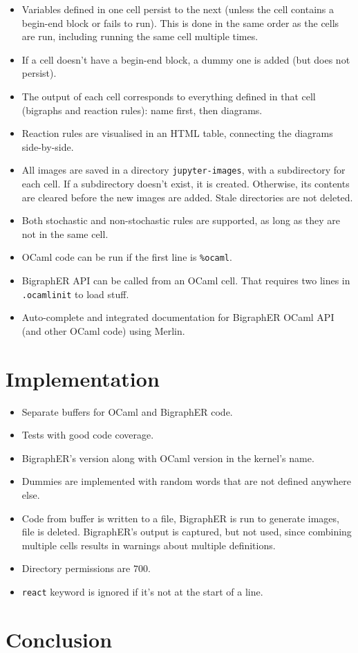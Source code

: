 \documentclass{article}
\begin{document}
\begin{itemize}
\item Variables defined in one cell persist to the next (unless the cell
  contains a begin-end block or fails to run). This is done in the same order as
  the cells are run, including running the same cell multiple times.
\item If a cell doesn't have a begin-end block, a dummy one is added (but does
  not persist).
\item The output of each cell corresponds to everything defined in that cell
  (bigraphs and reaction rules): name first, then diagrams.
\item Reaction rules are visualised in an HTML table, connecting the diagrams
  side-by-side.
\item All images are saved in a directory \texttt{jupyter-images}, with a
  subdirectory for each cell. If a subdirectory doesn't exist, it is created.
  Otherwise, its contents are cleared before the new images are added. Stale
  directories are not deleted.
\item Both stochastic and non-stochastic rules are supported, as long as they
  are not in the same cell.
\item OCaml code can be run if the first line is \texttt{\%ocaml}.

\item BigraphER API can be called from an OCaml cell. That requires two lines in
  \texttt{.ocamlinit} to load stuff.
\item Auto-complete and integrated documentation for BigraphER OCaml API (and
  other OCaml code) using Merlin.
\end{itemize}

\section{Implementation}


\begin{itemize}
\item Separate buffers for OCaml and BigraphER code.
\item Tests with good code coverage.
\item BigraphER's version along with OCaml version in the kernel's name.
\item Dummies are implemented with random words that are not defined anywhere else.
\item Code from buffer is written to a file, BigraphER is run to generate
  images, file is deleted. BigraphER's output is captured, but not used, since
  combining multiple cells results in warnings about multiple definitions.
\item Directory permissions are $700$.
\item \texttt{react} keyword is ignored if it's not at the start of a line.
\end{itemize}

\section{Conclusion}
\end{document}
